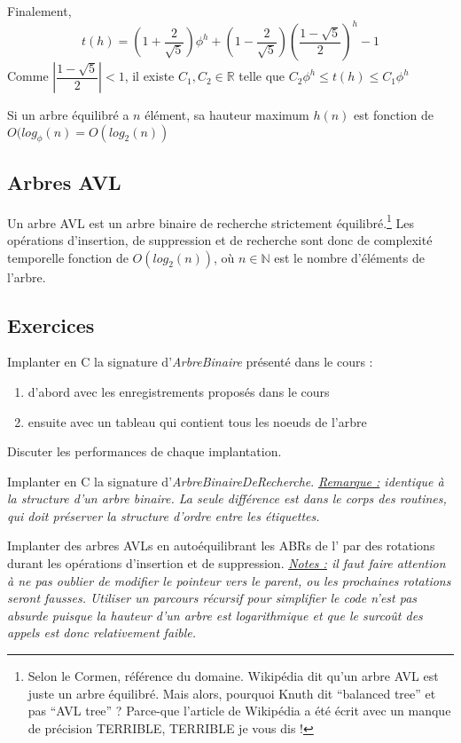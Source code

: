\documentclass[../../../main.tex]{subfiles}
\begin{document}
Finalement,
$$t(h) = (1 + \frac{2}{\sqrt{5}})\phi^h + (1 - \frac{2}{\sqrt{5}})\left(\dfrac{1 - \sqrt{5}}{2}\right)^h - 1$$
Comme $\left|\dfrac{1 - \sqrt{5}}{2}\right| < 1$, il existe $C_1, C_2\in\mathbb{R}$ telle que $C_2\phi^h \leq t(h)\leq C_1\phi^h$

Si un arbre équilibré a $n$ élément, sa hauteur maximum $h(n)$ est fonction de $O(log_\phi(n) = O(log_2(n))$
\subsection{Arbres AVL}
\label{sub:arbres_avl}
 {
	Un arbre AVL est un arbre binaire de recherche strictement équilibré.\footnote{Selon le Cormen, référence du domaine. Wikipédia dit qu'un arbre AVL est juste un arbre équilibré. Mais alors, pourquoi Knuth dit ``balanced tree'' et pas ``AVL tree'' ? Parce-que l'article de Wikipédia a été écrit avec un manque de précision TERRIBLE, TERRIBLE je vous dis !}
}
Les opérations d'insertion, de suppression et de recherche sont donc de complexité temporelle fonction de $O(log_2(n))$, où $n\in\mathbb{N}$ est le nombre d'éléments de l'arbre.
\subsection{Exercices}
 Implanter en C la signature d'\textit{ArbreBinaire} présenté dans le cours :
\begin{enumerate}
	\item d'abord avec les enregistrements proposés dans le cours
	\item ensuite avec un tableau qui contient tous les noeuds de l'arbre
\end{enumerate}
Discuter les performances de chaque implantation.

 Implanter en C la signature d'\textit{ArbreBinaireDeRecherche}.\newline
\textit{\underline{Remarque :} identique à la structure d'un arbre binaire. La seule différence est dans le corps des routines, qui doit préserver la structure d'ordre entre les étiquettes.}

 \newline
Implanter des arbres AVLs en autoéquilibrant les ABRs de l' par des rotations durant les opérations d'insertion et de suppression. \newline
\textit{\underline{Notes :} il faut faire attention à ne pas oublier de modifier le pointeur vers le parent, ou les prochaines rotations seront fausses. Utiliser un parcours récursif pour simplifier le code n'est pas absurde puisque la hauteur d'un arbre est logarithmique et que le surcoût des appels est donc relativement faible.}




\end{document}

